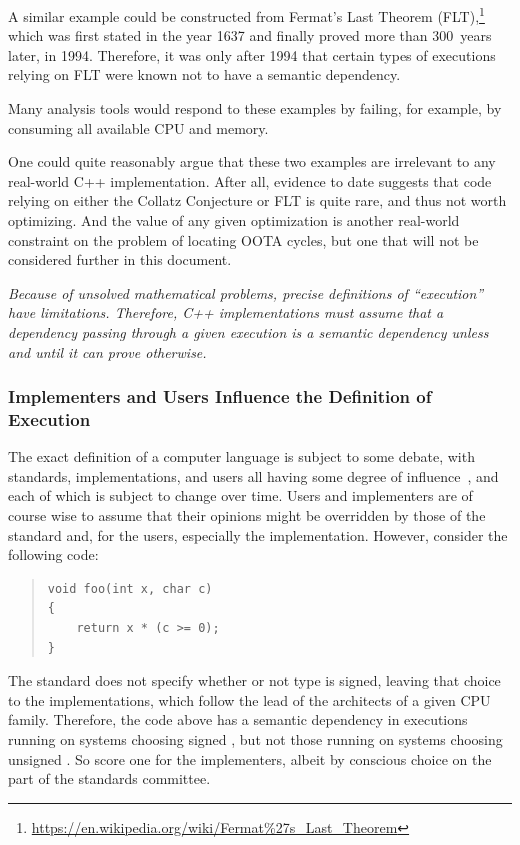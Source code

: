 \documentclass[10]{article}
\begin{document}
A similar example could be constructed from Fermat's Last Theorem
(FLT),\footnote{
\url{https://en.wikipedia.org/wiki/Fermat\%27s_Last_Theorem}}
which was first stated in the year 1637 and finally proved more than
300~years later, in 1994.
Therefore, it was only after 1994 that certain types of executions
relying on FLT were known not to have a semantic dependency.

Many analysis tools would respond to these examples by failing, for example,
by consuming all available CPU and memory.

One could quite reasonably argue that these two examples are irrelevant
to any real-world C++ implementation.
After all, evidence to date suggests that code relying on either the
Collatz Conjecture or FLT is quite rare, and thus not worth optimizing.
And the value of any given optimization is another real-world constraint
on the problem of locating OOTA cycles, but one that will not be considered
further in this document.

\emph{Because of unsolved mathematical problems, precise definitions of
``execution'' have limitations.
Therefore, C++ implementations must assume that a dependency passing
through a given execution is a semantic dependency unless and until it
can prove otherwise.}

\subsubsection{Implementers and Users Influence the Definition of Execution}
\label{sec:Implementers and Users Influence the Definition of Execution}

The exact definition of a computer language is subject to some debate,
with standards, implementations, and users all having some degree of
influence~\cite{KayvanMemarian2016DepthOfC-1,KayvanMemarian2016DepthOfC-2},
and each of which is subject to change over time.
Users  and implementers are of course wise to assume that their opinions
might be overridden by those of the standard and, for the users,
especially the implementation.
However, consider the following code:

\begin{quote}
\begin{verbatim}
void foo(int x, char c)
{
    return x * (c >= 0);
}
\end{verbatim}
\end{quote}

The standard does not specify whether or not type  is signed,
leaving that choice to the implementations, which follow the lead
of the architects of a given CPU family.
Therefore, the code above has a semantic dependency in executions running
on systems choosing signed , but not those running on systems
choosing unsigned .
So score one for the implementers, albeit by conscious choice on the
part of the standards committee.
\end{document}
